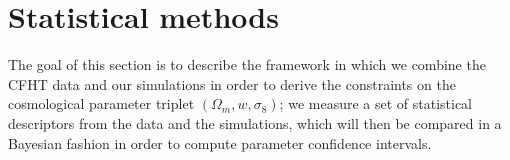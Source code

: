\documentclass[reprint,aps,prd,superscriptaddress,showkeys,showpacs]{revtex4-1}
\begin{document}


\section{Statistical methods}
The goal of this section is to describe the framework in which we combine the CFHT data and our simulations in order to derive the constraints on the cosmological parameter triplet $(\Omega_m,w,\sigma_8)$; we measure a set of statistical descriptors from the data and the simulations, which will then be compared in a Bayesian fashion in order to compute parameter confidence intervals.
\end{document}
